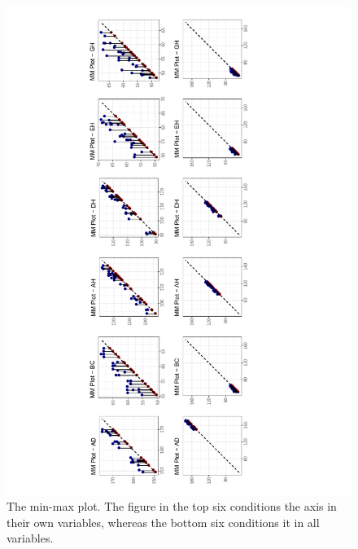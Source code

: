 \documentclass[article]{jss}
\begin{document}
\begin{appendix}
\begin{figure}[t!]
\centering
\includegraphics[width=1\textwidth]{pic/mmplot} 
\caption{\label{fig:minmax} The min-max plot. The figure in the top six conditions the axis in their own variables, whereas the bottom six conditions it in all variables.}
\end{figure}





\end{appendix}
\end{document}
